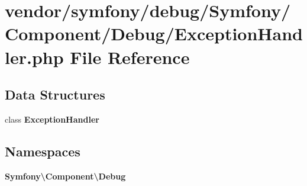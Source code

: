\section{vendor/symfony/debug/\+Symfony/\+Component/\+Debug/\+Exception\+Handler.php File Reference}
\label{symfony_2debug_2_symfony_2_component_2_debug_2_exception_handler_8php}
\subsection*{Data Structures}
\begin{DoxyCompactItemize}
\item 
class {\bf Exception\+Handler}
\end{DoxyCompactItemize}
\subsection*{Namespaces}
\begin{DoxyCompactItemize}
\item 
 {\bf Symfony\textbackslash{}\+Component\textbackslash{}\+Debug}
\end{DoxyCompactItemize}
